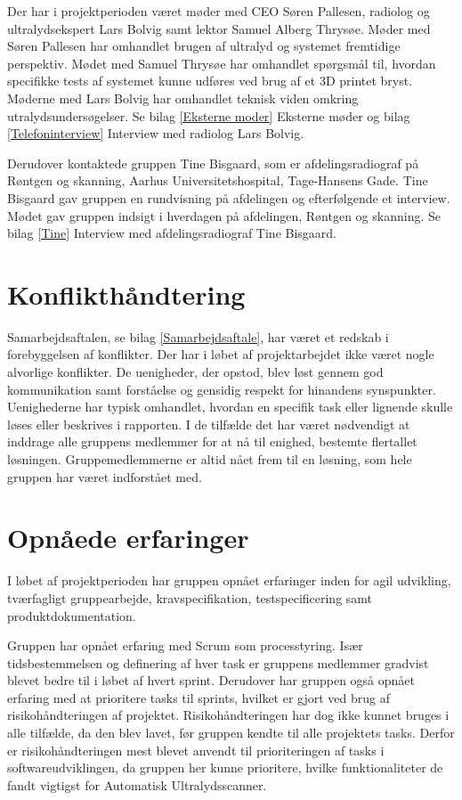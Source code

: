 Der har i projektperioden været møder med CEO Søren Pallesen, radiolog og ultralydsekspert Lars Bolvig samt lektor Samuel Alberg Thrysøe. Møder med Søren Pallesen har omhandlet brugen af ultralyd og systemet fremtidige perspektiv. Mødet med Samuel Thrysøe har omhandlet spørgsmål til, hvordan specifikke tests af systemet kunne udføres ved brug af et 3D printet bryst. Møderne med Lars Bolvig har omhandlet teknisk viden omkring utralydsundersøgelser. Se bilag \ref{Eksterne moder} Eksterne møder og bilag \ref{Telefoninterview} Interview med radiolog Lars Bolvig. 

Derudover kontaktede gruppen Tine Bisgaard, som er afdelingsradiograf på Røntgen og skanning, Aarhus Universitetshospital, Tage-Hansens Gade. Tine Bisgaard gav gruppen en rundvisning på afdelingen og efterfølgende et interview. Mødet gav gruppen indsigt i hverdagen på afdelingen, Røntgen og skanning. Se bilag \ref{Tine} Interview med afdelingsradiograf Tine Bisgaard. 

\section{Konflikthåndtering}
Samarbejdsaftalen, se bilag \ref{Samarbejdsaftale}, har været et redskab i forebyggelsen af konflikter. Der har i løbet af projektarbejdet ikke været nogle alvorlige konflikter. De uenigheder, der opstod, blev løst gennem god kommunikation samt forståelse og gensidig respekt for hinandens synspunkter. Uenighederne har typisk omhandlet, hvordan en specifik task eller lignende skulle løses eller beskrives i rapporten. I de tilfælde det har været nødvendigt at inddrage alle gruppens medlemmer for at nå til enighed, bestemte flertallet løsningen. Gruppemedlemmerne er altid nået frem til en løsning, som hele gruppen har været indforstået med.

\section{Opnåede erfaringer}
I løbet af projektperioden har gruppen opnået erfaringer inden for agil udvikling, tværfagligt gruppearbejde, kravspecifikation, testspecificering samt produktdokumentation.

Gruppen har opnået erfaring med Scrum som processtyring. Især tidsbestemmelsen og definering af hver task er gruppens medlemmer gradvist blevet bedre til i løbet af hvert sprint. Derudover har gruppen også opnået erfaring med at prioritere tasks til sprints, hvilket er gjort ved brug af risikohåndteringen af projektet. Risikohåndteringen har dog ikke kunnet bruges i alle tilfælde, da den blev lavet, før gruppen kendte til alle projektets tasks. Derfor er risikohåndteringen mest blevet anvendt til prioriteringen af tasks i softwareudviklingen, da gruppen her kunne prioritere, hvilke funktionaliteter de fandt vigtigst for Automatisk Ultralydsscanner. 

